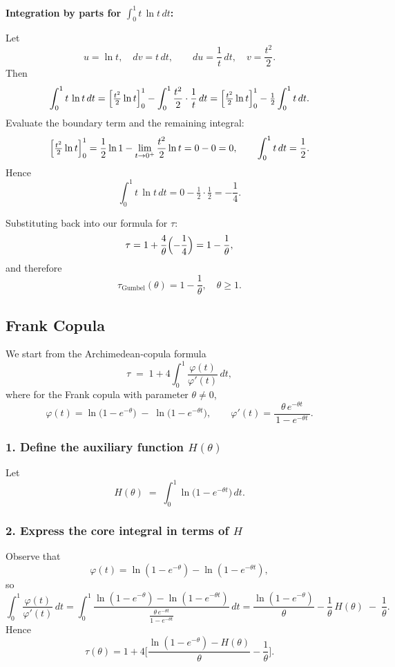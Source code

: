 \documentclass[11pt]{article}
\begin{document}
\medskip
\noindent\textbf{Integration by parts for \(\displaystyle \int_{0}^{1}t\,\ln t\,dt\):}

Let
\[
u=\ln t,\quad dv=t\,dt,
\qquad
du=\frac{1}{t}\,dt,\quad v=\frac{t^2}{2}.
\]
Then
\[
\int_{0}^{1}t\,\ln t\,dt
=\Bigl[\tfrac{t^2}{2}\ln t\Bigr]_{0}^{1}
-\int_{0}^{1}\frac{t^2}{2}\cdot\frac{1}{t}\,dt
=\Bigl[\tfrac{t^2}{2}\ln t\Bigr]_{0}^{1}
-\tfrac{1}{2}\int_{0}^{1}t\,dt.
\]
Evaluate the boundary term and the remaining integral:
\[
\Bigl[\tfrac{t^2}{2}\ln t\Bigr]_{0}^{1}
=\frac{1}{2}\ln1
-\lim_{t\to0^+}\frac{t^2}{2}\ln t
=0-0=0,
\qquad
\int_{0}^{1}t\,dt=\frac{1}{2}.
\]
Hence
\[
\int_{0}^{1}t\,\ln t\,dt
=0-\tfrac{1}{2}\cdot\tfrac{1}{2}
=-\frac{1}{4}.
\]

\medskip
\noindent Substituting back into our formula for \(\tau\):
\[
\tau
=1+\frac{4}{\theta}\Bigl(-\frac{1}{4}\Bigr)
=1-\frac{1}{\theta},
\]
and therefore
\[
\boxed{\tau_{\mathrm{Gumbel}}(\theta)
=1-\frac{1}{\theta},\quad\theta\ge1.}
\]

\subsection{Frank Copula}
We start from the Archimedean‐copula formula
\[
\tau \;=\; 1 + 4 \int_{0}^{1} \frac{\varphi(t)}{\varphi'(t)} \, dt,
\]
where for the Frank copula with parameter $\theta\neq0$,
\[
\varphi(t)
=\ln\!\bigl(1 - e^{-\theta}\bigr)
\;-\;
\ln\!\bigl(1 - e^{-\theta t}\bigr),
\qquad
\varphi'(t)
=\frac{\theta\,e^{-\theta t}}{\,1 - e^{-\theta t}\,}.
\]

\subsubsection*{1. Define the auxiliary function $H(\theta)$}

Let
\[
H(\theta)
\;=\;
\int_{0}^{1}
\ln\!\bigl(1 - e^{-\theta t}\bigr)
\,dt.
\]

\subsubsection*{2. Express the core integral in terms of $H$}

Observe that
\[
\varphi(t)
=\ln(1 - e^{-\theta}) - \ln(1 - e^{-\theta t}),
\]
so
\[
\int_{0}^{1}\frac{\varphi(t)}{\varphi'(t)}\,dt
=
\int_{0}^{1}
\frac{\ln(1 - e^{-\theta}) - \ln(1 - e^{-\theta t})}
     {\displaystyle\frac{\theta\,e^{-\theta t}}{1 - e^{-\theta t}}}
\,dt
=
\frac{\ln(1 - e^{-\theta})}{\theta}
-
\frac{1}{\theta}\,H(\theta)
\;-\;\frac{1}{\theta}.
\]
Hence
\[
\tau(\theta)
=1
+4\biggl[
\frac{\ln(1 - e^{-\theta}) - H(\theta)}{\theta}
-\frac{1}{\theta}
\biggr].
\]
\end{document}
